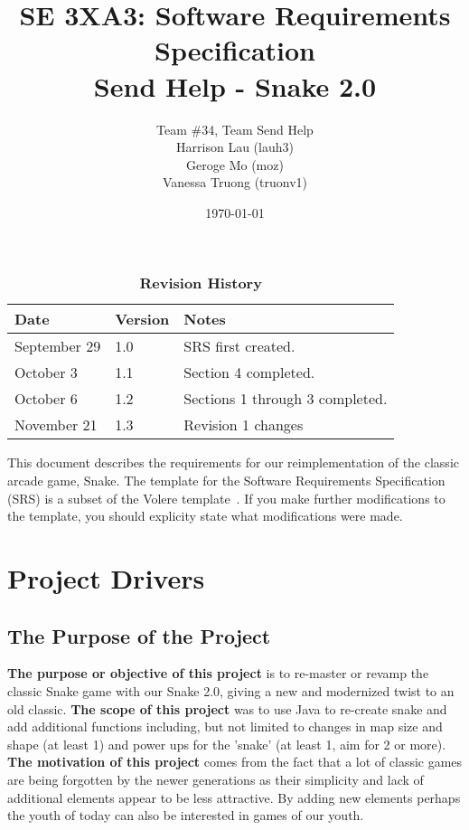 \documentclass[12pt, titlepage]{article}
\title{SE 3XA3: Software Requirements Specification\\Send Help - Snake 2.0}
\author{Team \#34, Team Send Help
		\\ Harrison Lau	(lauh3)
		\\ Geroge Mo	(moz)
		\\ Vanessa Truong	(truonv1)
}
\date{\today}
\begin{document}
\maketitle

\tableofcontents
\listoftables

\begin{table}[bp]
\caption{\bf Revision History}
\begin{tabularx}{\textwidth}{p{3cm}p{2cm}X}
\toprule {\bf Date} & {\bf Version} & {\bf Notes}\\
\midrule
September 29 & 1.0 & SRS first created.\\
October 3 & 1.1 & Section 4 completed.\\
October 6 & 1.2 & Sections 1 through 3 completed.\\
November 21 & 1.3 & Revision 1 changes\\
\bottomrule
\end{tabularx}
\end{table}

\newpage


This document describes the requirements for our reimplementation of the classic arcade game, Snake. The template for the Software
Requirements Specification (SRS) is a subset of the Volere
template~\citep{RobertsonAndRobertson2012}.  If you make further modifications
to the template, you should explicity state what modifications were made.

\section{Project Drivers}

\subsection{The Purpose of the Project}

\textbf{The purpose or objective of this project} is to re-master or revamp the classic Snake game with our Snake 2.0, giving a new and modernized twist to an old classic. \textbf{The scope of this project} was to use Java to re-create snake and add additional functions including, but not limited to changes in map size and shape (at least 1) and power ups for the 'snake' (at least 1, aim for 2 or more). \textbf{The motivation of this project} comes from the fact that a lot of classic games are being forgotten by the newer generations as their simplicity and lack of additional elements appear to be less attractive. By adding new elements perhaps the youth of today can also be interested in games of our youth. 
\end{document}
